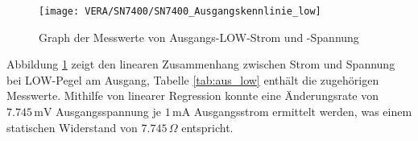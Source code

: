 \begin{figure}[h]
  \begin{center}
    \texttt{[image: VERA/SN7400/SN7400\_Ausgangskennlinie\_low]}
  \end{center}
  \caption{Graph der Messwerte von Ausgangs-LOW-Strom und -Spannung}
  \label{fig:graphic_low}
\end{figure}

Abbildung \ref{fig:graphic_low} zeigt den linearen Zusammenhang zwischen
Strom und Spannung bei LOW-Pegel am Ausgang, Tabelle \ref{tab:aus_low} enthält
die zugehörigen Messwerte. Mithilfe von linearer Regression
konnte eine Änderungsrate von $7.745 \, \si{\milli\volt}$ Ausgangsspannung je $1
\, \si{\milli\ampere}$ Ausgangsstrom ermittelt werden, was einem
statischen Widerstand von $7.745 \, \Omega$ entspricht.
